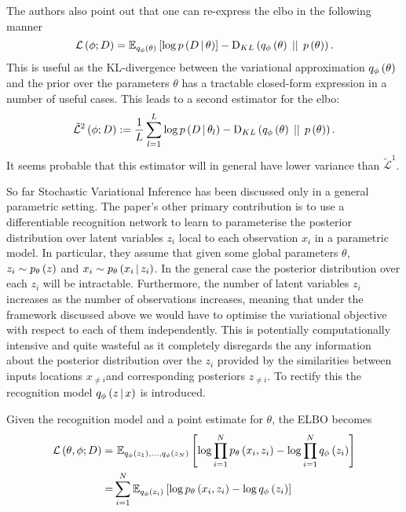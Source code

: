 \documentclass[../report.tex]{subfiles}
\begin{document}
The authors also point out that one can re-express the elbo in the following manner
\begin{equation}
  \mathcal{L} \left( \phi; D\right) = \mathbb{E}_{q_\phi \left( \theta\right)} \left[ \log p \left(D \, \middle\vert \, \theta \right) \right] - \textrm{D}_{KL} \left( q_\phi \left( \theta\right) \, \mid \mid \, p \left( \theta\right)\right).
\end{equation}
This is useful as the KL-divergence between the variational approximation $q_\phi \left( \theta\right)$ and the prior over the parameters $\theta$ has a tractable closed-form expression in a number of useful cases. This leads to a second estimator for the elbo:
\begin{equation}
  \tilde{\mathcal{L}}^2 \left( \phi; D\right) := \frac{1}{L} \sum_{l=1}^{L} \log p \left(D \, \middle\vert \, \theta_l \right) - \textrm{D}_{KL} \left( q_\phi \left( \theta\right) \, \mid \mid \, p \left( \theta\right)\right).
\end{equation}
It seems probable that this estimator will in general have lower variance than $\tilde{\mathcal{L}}^1$.

So far Stochastic Variational Inference has been discussed only in a general parametric setting. The paper's other primary contribution is to use a differentiable recognition network to learn to parameterise the posterior distribution over latent variables $z_i$ local to each observation $x_i$ in a parametric model. In particular, they assume that given some global parameters $\theta$, $z_i \sim p_\theta \left( z\right)$ and $x_i \sim p_\theta \left(x_i \, \middle\vert \, z_i \right)$. In the general case the posterior distribution over each $z_i$ will be intractable. Furthermore, the number of latent variables $z_i$ increases as the number of observations increases, meaning that under the framework discussed above we would have to optimise the variational objective with respect to each of them independently. This is potentially computationally intensive and quite wasteful as it completely disregards the any information about the posterior distribution over the $z_i$ provided by the similarities between inputs locations $x_{\neq i}$and corresponding posteriors $z_{\neq i}$. To rectify this the recognition model $q_\phi \left(z \, \middle\vert \, x \right)$ is introduced.

Given the recognition model and a point estimate for $\theta$, the ELBO becomes
\begin{align}
  \mathcal{L} \left( \theta, \phi; D\right) =& \,\, \mathbb{E}_{q_\phi \left( z_1\right),...,q_\phi \left( z_N\right)} \left[ \log \prod_{i=1}^{N} p_\theta \left( x_i, z_i\right) - \log \prod_{i=1}^{N} q_\phi \left( z_i\right) \right] \nonumber \\
  =& \sum_{i=1}^{N} \mathbb{E}_{q_\phi \left( z_i\right)} \left[ \log p_\theta \left( x_i, z_i\right) - \log q_\phi \left( z_i\right) \right] \nonumber \\
\end{align}
\end{document}
